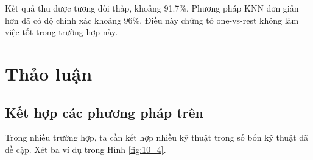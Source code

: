 Kết quả thu được tương đối thấp, khoảng 91.7\%. Phương pháp KNN đơn giản hơn đã
có độ chính xác khoảng 96\%. Điều này chứng tỏ one-vs-rest không làm việc tốt
trong trường hợp này.




\section{Thảo luận }

\subsection{Kết hợp các phương pháp trên}


Trong nhiều trường hợp, ta cần kết hợp nhiều kỹ thuật trong số bốn kỹ thuật đã
đề cập. Xét ba ví dụ trong Hình \ref{fig:10_4}.

